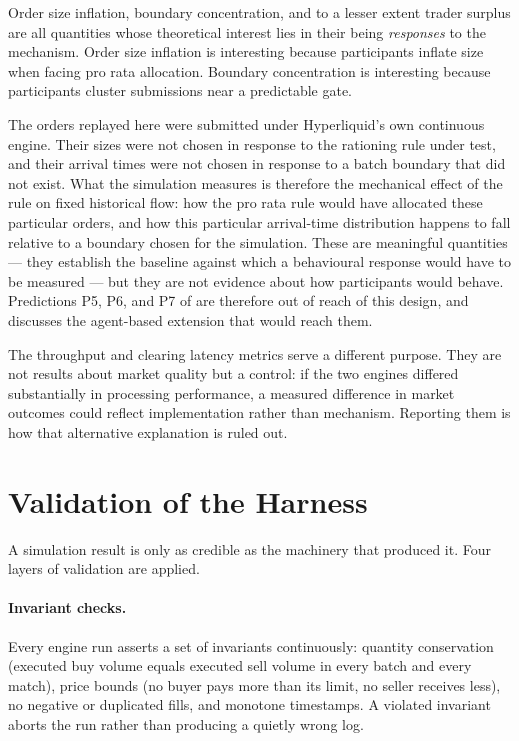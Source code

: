 Order size inflation, boundary concentration, and to a lesser extent
trader surplus are all quantities whose theoretical interest lies in
their being \emph{responses} to the mechanism. Order size inflation is
interesting because participants inflate size when facing pro rata
allocation. Boundary concentration is interesting because participants
cluster submissions near a predictable gate.

The orders replayed here were submitted under Hyperliquid's own
continuous engine. Their sizes were not chosen in response to the
rationing rule under test, and their arrival times were not chosen in
response to a batch boundary that did not exist. What the simulation
measures is therefore the mechanical effect of the rule on fixed
historical flow: how the pro rata rule would have allocated these
particular orders, and how this particular arrival-time distribution
happens to fall relative to a boundary chosen for the simulation. These
are meaningful quantities --- they establish the baseline against which
a behavioural response would have to be measured --- but they are not
evidence about how participants would behave. Predictions P5, P6, and P7
of  are therefore out of reach of this design, and
 discusses the agent-based extension that would
reach them.

The throughput and clearing latency metrics serve a different purpose.
They are not results about market quality but a control: if the two
engines differed substantially in processing performance, a measured
difference in market outcomes could reflect implementation rather than
mechanism. Reporting them is how that alternative explanation is ruled
out.

\section{Validation of the Harness}
\label{sec:validation}

A simulation result is only as credible as the machinery that produced
it. Four layers of validation are applied.

\paragraph{Invariant checks.} Every engine run asserts a set of
invariants continuously: quantity conservation (executed buy volume
equals executed sell volume in every batch and every match), price
bounds (no buyer pays more than its limit, no seller receives less), no
negative or duplicated fills, and monotone timestamps. A violated
invariant aborts the run rather than producing a quietly wrong log.

